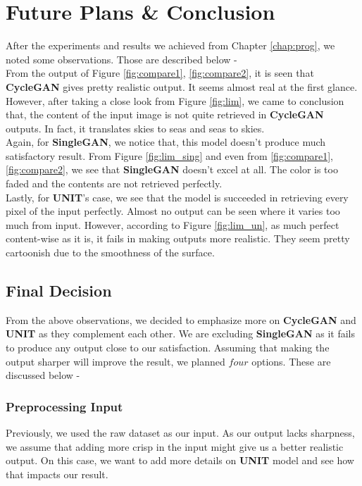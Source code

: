 
\chapter{Future Plans \& Conclusion}
After the experiments and results we achieved from Chapter \ref{chap:prog}, we noted some observations. Those are described below - \\
From the output of Figure \ref{fig:compare1}, \ref{fig:compare2}, it is seen that \textbf{CycleGAN} gives pretty realistic output. It seems almost real at the first glance. However, after taking a close look from Figure \ref{fig:lim}, we came to conclusion that, the content of the input image is not quite retrieved in \textbf{CycleGAN} outputs. In fact, it translates skies to seas and seas to skies.\\
Again, for \textbf{SingleGAN}, we notice that, this model doesn't produce much satisfactory result. From Figure \ref{fig:lim_sing} and even from \ref{fig:compare1}, \ref{fig:compare2}, we see that \textbf{SingleGAN} doesn't excel at all. The color is too faded and the contents are not retrieved perfectly.\\
Lastly, for \textbf{UNIT}'s case, we see that the model is succeeded in retrieving every pixel of the input perfectly. Almost no output can be seen where it varies too much from input. However, according to Figure \ref{fig:lim_un}, as much perfect content-wise as it is, it fails in making outputs more realistic. They seem pretty cartoonish due to the smoothness of the surface.

\section{Final Decision}

From the above observations, we decided to emphasize more on \textbf{CycleGAN} and \textbf{UNIT} as they complement each other. We are excluding \textbf{SingleGAN} as it fails to produce any output close to our satisfaction. Assuming that making the output sharper will improve the result, we planned $four$ options. These are discussed below -

\subsection{Preprocessing Input}
Previously, we used the raw dataset as our input. As our output lacks sharpness, we assume that adding more crisp in the input might give us a better realistic output. On this case, we want to add more details on \textbf{UNIT} model and see how that impacts our result.

